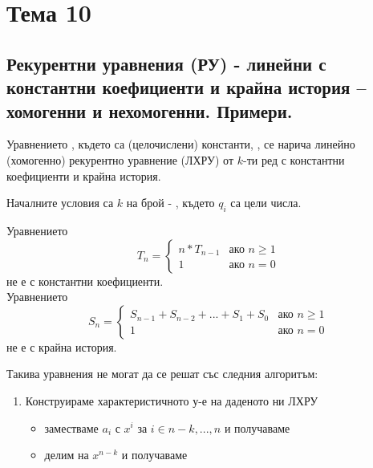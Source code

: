 \section{Тема 10}

\subsection*{Рекурентни уравнения (РУ) - линейни с константни коефициенти и крайна история – 
хомогенни и нехомогенни. Примери.}

\begin{definition}
    Уравнението , където 
     са (целочислени) константи, , се нарича линейно 
    (хомогенно) рекурентно уравнение (ЛХРУ) от \(k\)-ти ред с константни коефициенти и крайна история.
\end{definition}

Началните условия са \(k\) на брой - , където \(q_i\) са цели числа.

\begin{note}
    Уравнението 
    \begin{equation*}
        T_n = 
        \begin{cases}
            n * T_{n - 1} & \text{ако \(n \ge 1\)} \\
            1 & \text{ако \(n = 0\)}
        \end{cases}
    \end{equation*}
    не е с константни коефициенти. \\
    Уравнението 
    \begin{equation*}
        S_n = 
        \begin{cases}
            S_{n - 1} + S_{n - 2} + ... + S_1 + S_0 & \text{ако \(n \ge 1\)} \\
            1 & \text{ако \(n = 0\)}
        \end{cases}
    \end{equation*}
    не е с крайна история. 
\end{note}

Такива уравнения не могат да се решат със следния алгоритъм:
\begin{enumerate}
    \item Конструираме характеристичното у-е на даденото ни ЛХРУ
    \begin{itemize}
        \item заместваме \(a_i\) с \(x^i\) за \(i \in {n - k, ..., n}\) и получаваме \\
        \item делим на \(x^{n - k}\) и получаваме 
    \end{itemize}
\end{enumerate}

